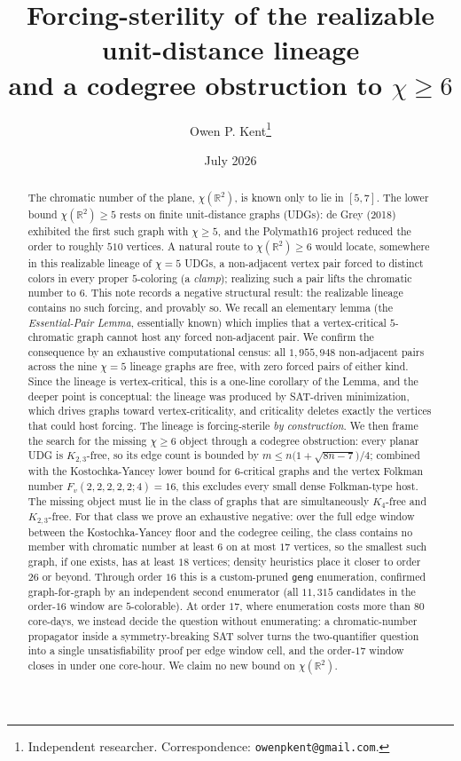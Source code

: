 \documentclass[11pt]{article}
\title{Forcing-sterility of the realizable unit-distance lineage\\
and a codegree obstruction to $\chi \ge 6$}
\author{Owen P. Kent\thanks{Independent researcher.
  Correspondence: \texttt{owenpkent@gmail.com}.}}
\date{July 2026}
\theoremstyle{definition}
\newcommand{\R}{\mathbb{R}}
\newcommand{\chrom}{\chi}
\begin{document}
\maketitle

\begin{abstract}
The chromatic number of the plane, $\chrom(\R^2)$, is known only to lie in
$[5,7]$. The lower bound $\chrom(\R^2) \ge 5$ rests on finite unit-distance
graphs (UDGs): de Grey (2018) exhibited the first such graph with $\chrom \ge 5$,
and the Polymath16 project reduced the order to roughly $510$ vertices. A natural
route to $\chrom(\R^2) \ge 6$ would locate, somewhere in this realizable lineage
of $\chrom = 5$ UDGs, a non-adjacent vertex pair forced to distinct colors in
every proper $5$-coloring (a \emph{clamp}); realizing such a pair lifts the
chromatic number to $6$. This note records a negative structural result: the
realizable lineage contains no such forcing, and provably so. We recall an
elementary lemma (the \emph{Essential-Pair Lemma}, essentially known) which
implies that a vertex-critical $5$-chromatic graph cannot host any forced
non-adjacent pair. We confirm the
consequence by an exhaustive computational census: all $1{,}955{,}948$
non-adjacent pairs across the nine $\chrom = 5$ lineage graphs are free, with zero
forced pairs of either kind. Since the lineage is vertex-critical, this is a
one-line corollary of the Lemma, and the deeper point is conceptual: the lineage
was produced by SAT-driven minimization, which drives graphs toward
vertex-criticality, and criticality deletes exactly the vertices that could host
forcing. The lineage is forcing-sterile \emph{by construction}. We then frame the
search for the missing $\chrom \ge 6$ object through a codegree obstruction: every
planar UDG is $K_{2,3}$-free, so its edge count is bounded by
$m \le n\bigl(1 + \sqrt{8n-7}\bigr)/4$; combined with the Kostochka-Yancey lower
bound for $6$-critical graphs and the vertex Folkman number
$F_v(2,2,2,2,2;4) = 16$, this excludes every small dense Folkman-type host. The
missing object must lie in the class of graphs that are simultaneously $K_4$-free
and $K_{2,3}$-free. For that class we prove an exhaustive negative: over the full
edge window between the Kostochka-Yancey floor and the codegree ceiling, the class
contains no member with chromatic number at least $6$ on at most $17$ vertices, so
the smallest such graph, if one exists, has at least $18$ vertices; density
heuristics place it closer to order $26$ or beyond. Through order $16$ this is a
custom-pruned \texttt{geng} enumeration, confirmed graph-for-graph by an
independent second enumerator (all $11{,}315$ candidates in the order-$16$ window
are $5$-colorable). At order $17$, where enumeration costs more than $80$ core-days,
we instead decide the question without enumerating: a chromatic-number propagator
inside a symmetry-breaking SAT solver turns the two-quantifier question into a
single unsatisfiability proof per edge window cell, and the order-$17$ window
closes in under one core-hour. We claim no new bound on $\chrom(\R^2)$.
\end{abstract}
\end{document}
